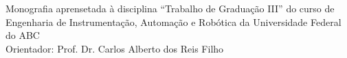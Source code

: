   \begin{center}
  \thispagestyle{empty}
   {\large \textbf{\theauthor}} \\[6cm]



   {\Large \thetitle}\\[6cm]

   \hspace{.25\textwidth} %
   \begin{minipage}{.7\textwidth}
   \large Monografia aprensetada à disciplina “Trabalho de
   Graduação III” do curso de Engenharia
   de Instrumentação, Automação e Robótica da Universidade Federal do
   ABC
   \\[1cm]
   Orientador: Prof. Dr. Carlos Alberto dos Reis Filho
  \end{minipage}
  \vfill
  

\vspace{2cm}

\large \textbf{\local}

\large \textbf{\thedate}
\end{center}
\newpage
